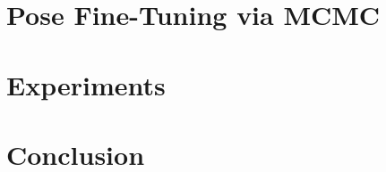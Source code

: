 \documentclass[10pt,twocolumn,letterpaper]{article}
\begin{document}

\section{Pose Fine-Tuning via MCMC}
\label{sec:fine}

%
\section{Experiments}
\label{sec:experiments}




\section{Conclusion}


{\small


}
\end{document}
